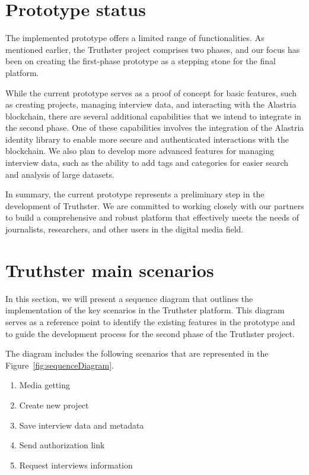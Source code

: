 \documentclass[target=mst,aauheader=]{thud}
\begin{document}
\section{Prototype status}

The implemented prototype offers a limited range of functionalities. As mentioned earlier, the Truthster project comprises two phases, and our focus has been on creating the first-phase prototype as a stepping stone for the final platform.

While the current prototype serves as a proof of concept for basic features, such as creating projects, managing interview data, and interacting with the Alastria blockchain, there are several additional capabilities that we intend to integrate in the second phase. One of these capabilities involves the integration of the Alastria identity library to enable more secure and authenticated interactions with the blockchain. We also plan to develop more advanced features for managing interview data, such as the ability to add tags and categories for easier search and analysis of large datasets.

In summary, the current prototype represents a preliminary step in the development of Truthster. We are committed to working closely with our partners to build a comprehensive and robust platform that effectively meets the needs of journalists, researchers, and other users in the digital media field.

\section{Truthster main scenarios}

In this section, we will present a sequence diagram that outlines the implementation of the key scenarios in the Truthster platform. This diagram serves as a reference point to identify the existing features in the prototype and to guide the development process for the second phase of the Truthster project.

The diagram includes the following scenarios that are represented in the Figure~\ref{fig:sequenceDiagram}.

\begin{enumerate}

    \item Media getting
    \item Create new project
    \item Save interview data and metadata
    \item Send authorization link
    \item Request interviews information

\end{enumerate}
\end{document}
